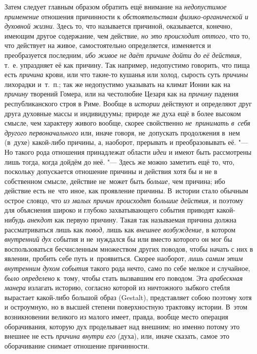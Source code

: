 Затем следует главным образом обратить ещё внимание на
{\em недопустимое применение} отношения причинности к
{\em обстоятельствам физико-органической и духовной жизни}. Здесь то, что
называется причиной, оказывается, конечно, имеющим другое содержание, чем
действие, {\em но это происходит оттого,} что то, что действует на живое,
самостоятельно определяется, изменяется и преобразуется последним,
{\em ибо живое не даёт причине дойти до её действия,} т.~е. упраздняет её как
причину. Так например, недопустимо говорить, что пища есть {\em причина} крови,
или что такие-то кушанья или холод, сырость суть {\em причины} лихорадки
и~т.~п.; так же недопустимо указывать на климат Ионии как на {\em причину}
творений Гомера, или на честолюбие Цезаря как на {\em причину} падения
республиканского строя в Риме. Вообще в {\em истории} действуют и определяют
друг друга духовные массы и индивидуумы; природе же духа ещё в более высоком
смысле, чем характеру живого вообще, скорее свойственно
{\em не~принимать в~себя другого первоначального} или, иначе говоря,
не~допускать продолжения в~нем (в~духе) какой-либо причины, а, наоборот,
прерывать и преобразовывать её. "--- Но такого рода отношения принадлежат
области {\em идеи} и имеют быть рассмотрены лишь тогда, когда дойдём до неё.
"--- Здесь же можно заметить ещё то, что, поскольку допускается отношение
причины и действия хотя бы и не в собственном смысле, действие не~может быть
{\em больше,} чем причина; ибо действие есть не~что иное, как проявление
причины. В~истории стало обычным острое словцо, что {\em из малых причин
происходят большие действия,} и поэтому для объяснения широко и глубоко
захватывающего события приводят какой-нибудь {\em анекдот} как первую причину.
Такая так называемая причина должна рассматриваться лишь как {\em повод,} лишь
как {\em внешнее возбуждение,} в котором {\em внутренний дух} события и
не~нуждался бы или вместо которого он мог бы воспользоваться бесчисленным
множеством других поводов, чтобы начать с них в явлении, пробить себе путь
и~проявиться. Скорее наоборот, {\em лишь самим этим внутренним духом события}
такого рода нечто, само по себе мелкое и случайное, {\em было определено}
к~тому, чтобы стать вызвавшим его поводом. Эта {\em арабескная манера} излагать
историю, согласно которой из ничтожного зыбкого стебля вырастает какой-либо
большой образ (Gestalt), представляет собою поэтому хотя и остроумную, но в
высшей степени поверхностную трактовку истории. В~этом возникновении великого
из малого имеет, правда, вообще место операция оборачивания, которую дух
проделывает над внешним; но именно потому это внешнее не есть
{\em причина внутри его} (духа), или, иначе сказать, самое это оборачивание
снимает отношение причинности.

